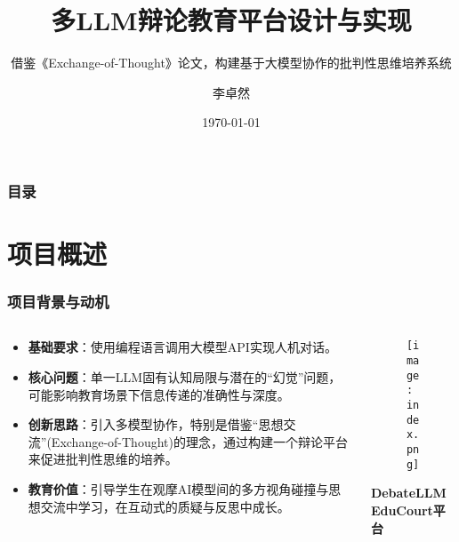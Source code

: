 \documentclass[aspectratio=169]{beamer} %
\title{多LLM辩论教育平台设计与实现}
\subtitle{借鉴《Exchange-of-Thought》论文，构建基于大模型协作的批判性思维培养系统}
\author{李卓然}
\institute{《教育与人工智能》课程报告}
\date{\today}
\begin{document}
\maketitle

\begin{frame}
\frametitle{目录}
\tableofcontents
\end{frame}

\section{项目概述}

\begin{frame}
\frametitle{项目背景与动机}
\begin{columns}
\begin{column}{0.4\textwidth}
\begin{itemize}
    \item \textbf{基础要求}：使用编程语言调用大模型API实现人机对话。
    \item \textbf{核心问题}：单一LLM固有认知局限与潜在的“幻觉”问题，可能影响教育场景下信息传递的准确性与深度。
    \item \textbf{创新思路}：引入多模型协作，特别是借鉴“思想交流”(Exchange-of-Thought)的理念，通过构建一个辩论平台来促进批判性思维的培养。
    \item \textbf{教育价值}：引导学生在观摩AI模型间的多方视角碰撞与思想交流中学习，在互动式的质疑与反思中成长。
\end{itemize}
\end{column}
\begin{column}{0.55\textwidth}
\begin{figure}
\centering
\texttt{[image: index.png]} %
\end{figure}
\begin{center}
\textbf{DebateLLMEduCourt平台}
\end{center}
\end{column}
\end{columns}
\end{frame}
\end{document}
